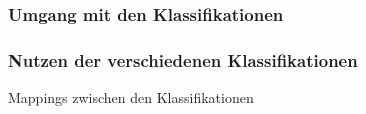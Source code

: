 \documentclass[12pt, xcolor=table]{beamer}
\begin{document}
\begin{frame}
	\frametitle{Umgang mit den Klassifikationen}
\end{frame}
\begin{frame}
	\frametitle{Nutzen der verschiedenen Klassifikationen}
    Mappings zwischen den Klassifikationen
\end{frame}
\end{document}
